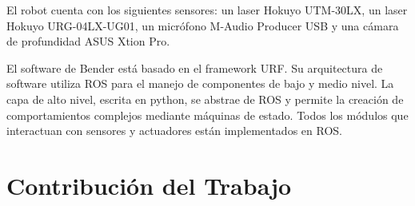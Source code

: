 El robot cuenta con los siguientes sensores: un laser Hokuyo UTM-30LX, un laser Hokuyo URG-04LX-UG01, un micr\'ofono M-Audio Producer USB y una c\'amara de profundidad ASUS Xtion Pro.

El software de Bender est\'a basado en el framework URF. Su arquitectura de software utiliza  ROS para el manejo de componentes de bajo y medio nivel. La capa de alto nivel, escrita en python, se abstrae de ROS y permite la creaci\'on de comportamientos complejos mediante m\'aquinas de estado. Todos los m\'odulos que interactuan con sensores y actuadores est\'an implementados en ROS.


%


\section{Contribuci\'on del Trabajo}




